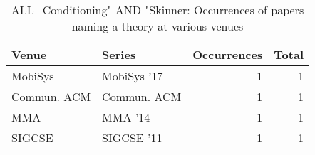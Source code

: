 \begin{table*}[t]
\begin{tabular}{llrr}
Venue & Series & Occurrences & Total\\\hline
\multirow{1}{*}{MobiSys } & MobiSys '17 & 1 & \multirow{1}{*}{1}\\
\multirow{1}{*}{Commun. ACM} & Commun. ACM & 1 & \multirow{1}{*}{1}\\
\multirow{1}{*}{MMA } & MMA '14 & 1 & \multirow{1}{*}{1}\\
\multirow{1}{*}{SIGCSE } & SIGCSE '11 & 1 & \multirow{1}{*}{1}\\
\end{tabular}
\caption{ALL\_Conditioning" AND "Skinner: Occurrences of papers naming a theory at various venues}
\end{table*}